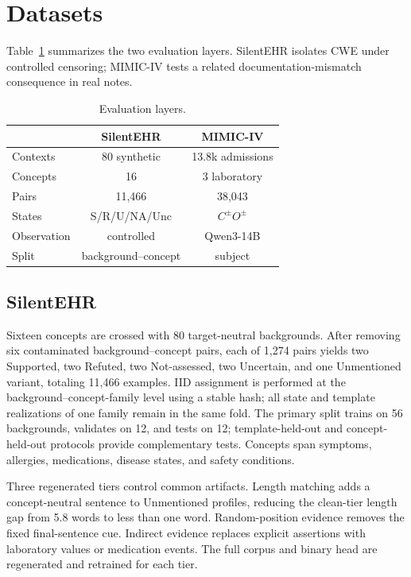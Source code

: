 \documentclass[11pt]{article}
\begin{document}
\section{Datasets}
Table~\ref{tab:datasets} summarizes the two evaluation layers. SilentEHR
isolates CWE under controlled censoring; MIMIC-IV tests a related
documentation-mismatch consequence in real notes.


\begin{table}[t]
  \centering
  \footnotesize
  \renewcommand{\arraystretch}{1.06}
  \caption{Evaluation layers.}
  \label{tab:datasets}
  \begin{tabular*}{\columnwidth}{@{\extracolsep{\fill}}lcc@{}}
    \toprule
    & \textbf{SilentEHR} & \textbf{MIMIC-IV} \\
    \midrule
    Contexts & 80 synthetic & 13.8k admissions \\
    Concepts & 16 & 3 laboratory \\
    Pairs & 11,466 & 38,043 \\
    States & S/R/U/NA/Unc & $C^{\pm}O^{\pm}$ \\
    Observation & controlled & Qwen3-14B \\
    Split & background--concept & subject \\
    \bottomrule
  \end{tabular*}
\end{table}


\subsection{SilentEHR}
Sixteen concepts are crossed with 80 target-neutral backgrounds. After removing
six contaminated background--concept pairs, each of 1{,}274 pairs yields two
Supported, two Refuted, two Not-assessed, two Uncertain, and one Unmentioned
variant, totaling 11{,}466 examples. IID assignment is performed at the
background--concept-family level using a stable hash; all state and template
realizations of one family remain in the same fold. The primary split trains on
56 backgrounds, validates on 12, and tests on 12; template-held-out and
concept-held-out protocols provide complementary tests. Concepts span symptoms,
allergies, medications, disease states, and safety conditions.

Three regenerated tiers control common artifacts. Length matching adds a
concept-neutral sentence to Unmentioned profiles, reducing the clean-tier
length gap from 5.8 words to less than one word. Random-position evidence
removes the fixed final-sentence cue. Indirect evidence replaces explicit
assertions with laboratory values or medication events. The full corpus and
binary head are regenerated and retrained for each tier.
\end{document}
